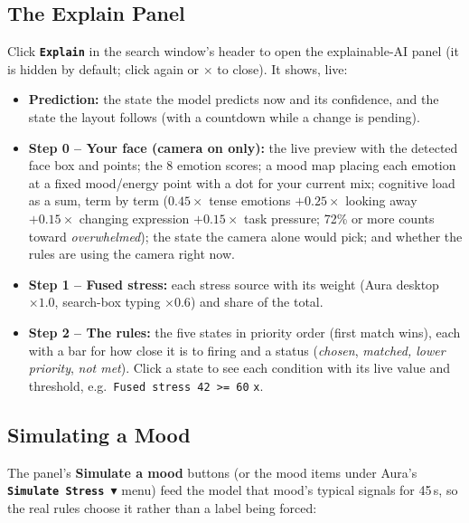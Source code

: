 \documentclass[11pt,a4paper]{article}
\newcommand{\uictrl}[1]{\texttt{\textbf{#1}}}
\begin{document}
\subsection{The Explain Panel}
Click \uictrl{Explain} in the search window's header to open the explainable-AI panel (it is hidden by default; click again or $\times$ to close). It shows, live:
\begin{itemize}[leftmargin=1.5em, itemsep=2pt]
    \item \textbf{Prediction:} the state the model predicts now and its confidence, and the state the layout follows (with a countdown while a change is pending).
    \item \textbf{Step 0 -- Your face (camera on only):} the live preview with the detected face box and points; the 8 emotion scores; a mood map placing each emotion at a fixed mood/energy point with a dot for your current mix; cognitive load as a sum, term by term ($0.45 \times$ tense emotions $+ 0.25 \times$ looking away $+ 0.15 \times$ changing expression $+ 0.15 \times$ task pressure; 72\% or more counts toward \textit{overwhelmed}); the state the camera alone would pick; and whether the rules are using the camera right now.
    \item \textbf{Step 1 -- Fused stress:} each stress source with its weight (Aura desktop $\times 1.0$, search-box typing $\times 0.6$) and share of the total.
    \item \textbf{Step 2 -- The rules:} the five states in priority order (first match wins), each with a bar for how close it is to firing and a status (\textit{chosen}, \textit{matched, lower priority}, \textit{not met}). Click a state to see each condition with its live value and threshold, e.g.\ \texttt{Fused stress 42 >= 60} \texttt{\textcolor{AuraRose}{x}}.
\end{itemize}

\subsection{Simulating a Mood}
The panel's \textbf{Simulate a mood} buttons (or the mood items under Aura's \uictrl{Simulate Stress $\blacktriangledown$} menu) feed the model that mood's typical signals for 45\,s, so the real rules choose it rather than a label being forced:
\end{document}
